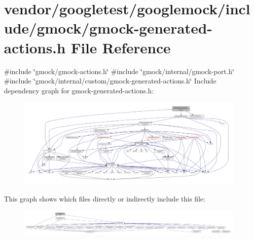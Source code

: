 \hypertarget{gmock-generated-actions_8h}{}\section{vendor/googletest/googlemock/include/gmock/gmock-\/generated-\/actions.h File Reference}
\label{gmock-generated-actions_8h}
{\ttfamily \#include \char`\"{}gmock/gmock-\/actions.\+h\char`\"{}}\newline
{\ttfamily \#include \char`\"{}gmock/internal/gmock-\/port.\+h\char`\"{}}\newline
{\ttfamily \#include \char`\"{}gmock/internal/custom/gmock-\/generated-\/actions.\+h\char`\"{}}\newline
Include dependency graph for gmock-\/generated-\/actions.h\+:
\nopagebreak
\begin{figure}[H]
\begin{center}
\leavevmode
\includegraphics[width=350pt]{gmock-generated-actions_8h__incl}
\end{center}
\end{figure}
This graph shows which files directly or indirectly include this file\+:
\nopagebreak
\begin{figure}[H]
\begin{center}
\leavevmode
\includegraphics[width=350pt]{gmock-generated-actions_8h__dep__incl}
\end{center}
\end{figure}
